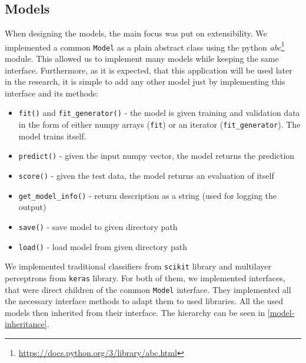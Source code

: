 \subsection*{Models}

When designing the models, the main focus was put on extensibility. We implemented a common \texttt{Model} as a plain abstract class using the python \textit{abc}\footnote{\url{https://docs.python.org/3/library/abc.html}} module. This allowed us to implement many models while keeping the same interface. Furthermore, as it is expected, that this application will be used later in the research, it is simple to add any other model just by implementing this interface and its methods:

\begin{itemize}

\item \texttt{fit()} and \texttt{fit\_generator()} - the model is given training and validation data in the form of either numpy arrays (\texttt{fit}) or an iterator (\texttt{fit\_generator}). The model trains itself.

\item \texttt{predict()} - given the input numpy vector, the model returns the prediction

\item \texttt{score()} - given the test data, the model returns an evaluation of itself

\item \texttt{get\_model\_info()} - return description as a string (used for logging the output)

\item \texttt{save()} - save model to given directory path

\item \texttt{load()} - load model from given directory path

\end{itemize} 

We implemented traditional classifiers from \texttt{scikit} library and multilayer perceptrons from \texttt{keras} library. For both of them, we implemented interfaces, that were direct children of the common \texttt{Model} interface. They implemented all the necessary interface methods to adapt them to used libraries. All the used models then inherited from their interface. The hierarchy can be seen in \autoref{model-inheritance}.

